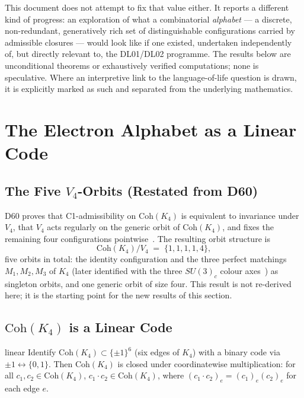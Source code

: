 \documentclass[11pt,a4paper]{article}
\newcommand{\Kfour}{K_4}
\newcommand{\Coh}{\mathrm{Coh}}
\newcommand{\Vfour}{V_4}
\begin{document}
This document does not attempt to fix that value either. It reports a different kind of progress: an exploration of what a combinatorial \emph{alphabet} --- a discrete, non-redundant, generatively rich set of distinguishable configurations carried by admissible closures --- would look like if one existed, undertaken independently of, but directly relevant to, the DL01/DL02 programme. The results below are unconditional theorems or exhaustively verified computations; none is speculative. Where an interpretive link to the language-of-life question is drawn, it is explicitly marked as such and separated from the underlying mathematics.

\section{The Electron Alphabet as a Linear Code}
\label{sec:code}

\subsection{The Five \texorpdfstring{$V_4$}{V4}-Orbits (Restated from D60)}

D60 proves that C1-admissibility on $\Coh(\Kfour)$ is equivalent to invariance under $\Vfour$, that $\Vfour$ acts regularly on the generic orbit of $\Coh(\Kfour)$, and fixes the remaining four configurations pointwise~\citep{D60}. The resulting orbit structure is
\begin{equation}
\Coh(\Kfour)/\Vfour \;=\; \{1,1,1,1,4\},
\label{eq:orbits}
\end{equation}
five orbits in total: the identity configuration and the three perfect matchings $M_1,M_2,M_3$ of $\Kfour$ (later identified with the three $SU(3)_c$ colour axes~\citep{D59}) as singleton orbits, and one generic orbit of size four. This result is not re-derived here; it is the starting point for the new results of this section.

\subsection{\texorpdfstring{$\Coh(\Kfour)$}{Coh(K4)} is a Linear Code}

\begin{theorembox}{}{linear}
Identify $\Coh(\Kfour)\subset\{\pm1\}^6$ (six edges of $\Kfour$) with a binary code via $\pm1\leftrightarrow\{0,1\}$. Then $\Coh(\Kfour)$ is closed under coordinatewise multiplication: for all $c_1,c_2\in\Coh(\Kfour)$, $c_1\cdot c_2\in\Coh(\Kfour)$, where $(c_1\cdot c_2)_e=(c_1)_e(c_2)_e$ for each edge $e$.
\end{theorembox}
\end{document}
